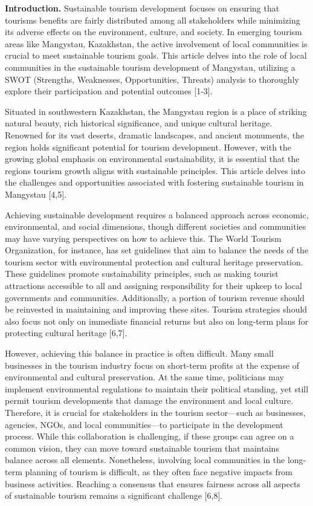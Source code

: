 \begin{multicols}{2}
{\bfseries Introduction.} Sustainable tourism development focuses on
ensuring that tourism\textquotesingle s benefits are fairly distributed
among all stakeholders while minimizing its adverse effects on the
environment, culture, and society. In emerging tourism areas like
Mangystau, Kazakhstan, the active involvement of local communities is
crucial to meet sustainable tourism goals. This article delves into the
role of local communities in the sustainable tourism development of
Mangystau, utilizing a SWOT (Strengths, Weaknesses, Opportunities,
Threats) analysis to thoroughly explore their participation and
potential outcomes {[}1-3{]}.

Situated in southwestern Kazakhstan, the Mangystau region is a place of
striking natural beauty, rich historical significance, and unique
cultural heritage. Renowned for its vast deserts, dramatic landscapes,
and ancient monuments, the region holds significant potential for
tourism development. However, with the growing global emphasis on
environmental sustainability, it is essential that the
region\textquotesingle s tourism growth aligns with sustainable
principles. This article delves into the challenges and opportunities
associated with fostering sustainable tourism in Mangystau {[}4,5{]}.

Achieving sustainable development requires a balanced approach across
economic, environmental, and social dimensions, though different
societies and communities may have varying perspectives on how to
achieve this. The World Tourism Organization, for instance, has set
guidelines that aim to balance the needs of the tourism sector with
environmental protection and cultural heritage preservation. These
guidelines promote sustainability principles, such as making tourist
attractions accessible to all and assigning responsibility for their
upkeep to local governments and communities. Additionally, a portion of
tourism revenue should be reinvested in maintaining and improving these
sites. Tourism strategies should also focus not only on immediate
financial returns but also on long-term plans for protecting cultural
heritage {[}6,7{]}.

However, achieving this balance in practice is often difficult. Many
small businesses in the tourism industry focus on short-term profits at
the expense of environmental and cultural preservation. At the same
time, politicians may implement environmental regulations to maintain
their political standing, yet still permit tourism developments that
damage the environment and local culture. Therefore, it is crucial for
stakeholders in the tourism sector---such as businesses, agencies, NGOs,
and local communities---to participate in the development process. While
this collaboration is challenging, if these groups can agree on a common
vision, they can move toward sustainable tourism that maintains balance
across all elements. Nonetheless, involving local communities in the
long-term planning of tourism is difficult, as they often face negative
impacts from business activities. Reaching a consensus that ensures
fairness across all aspects of sustainable tourism remains a significant
challenge {[}6,8{]}.


\end{multicols}
